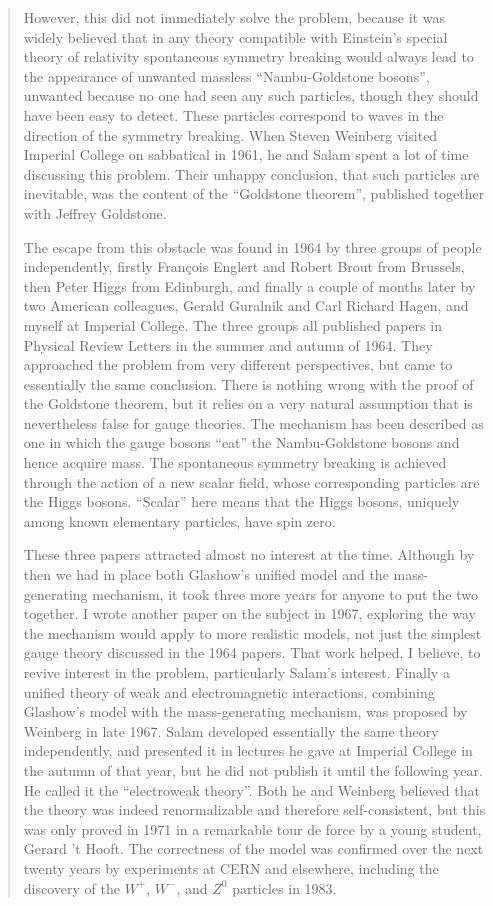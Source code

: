 \begin{quote}
However, this did not immediately solve the problem, because it was widely believed that in any theory compatible with Einstein’s special theory of relativity spontaneous symmetry breaking would always lead to the appearance of unwanted massless “Nambu-Goldstone bosons”, unwanted because no one had seen any such particles, though they should have been easy to detect. These particles correspond to waves in the direction of the symmetry breaking. When Steven Weinberg visited Imperial College on sabbatical in 1961, he and Salam spent a lot of time discussing this problem. Their unhappy conclusion, that such particles are inevitable, was the content of the “Goldstone theorem”, published together with Jeffrey Goldstone.

The escape from this obstacle was found in 1964 by three groups of people independently, firstly François Englert and Robert Brout from Brussels, then Peter Higgs from Edinburgh, and finally a couple of months later by two American colleagues, Gerald Guralnik and Carl Richard Hagen, and myself at Imperial College. The three groups all published papers in Physical Review Letters in the summer and autumn of 1964. They approached the problem from very different perspectives, but came to essentially the same conclusion. There is nothing wrong with the proof of the Goldstone theorem, but it relies on a very natural assumption that is nevertheless false for gauge theories. The mechanism has been described as one in which the gauge bosons “eat” the Nambu-Goldstone bosons and hence acquire mass. The spontaneous symmetry breaking is achieved through the action of a new scalar field, whose corresponding particles are the Higgs bosons. “Scalar” here means that the Higgs bosons, uniquely among known elementary particles, have spin zero.

These three papers attracted almost no interest at the time. Although by then we had in place both Glashow’s unified model and the mass-generating mechanism, it took three more years for anyone to put the two together. I wrote another paper on the subject in 1967, exploring the way the mechanism would apply to more realistic models, not just the simplest gauge theory discussed in the 1964 papers. That work helped, I believe, to revive interest in the problem, particularly Salam’s interest. Finally a unified theory of weak and electromagnetic interactions, combining Glashow’s model with the mass-generating mechanism, was proposed by Weinberg in late 1967. Salam developed essentially the same theory independently, and presented it in lectures he gave at Imperial College in the autumn of that year, but he did not publish it until the following year. He called it the “electroweak theory”. Both he and Weinberg believed that the theory was indeed renormalizable and therefore self-consistent, but this was only proved in 1971 in a remarkable tour de force by a young student, Gerard ’t Hooft. The correctness of the model was confirmed over the next twenty years by experiments at CERN and elsewhere, including the discovery of the $W^+$, $W^-$, and $Z^0$ particles in 1983.


\end{quote}
